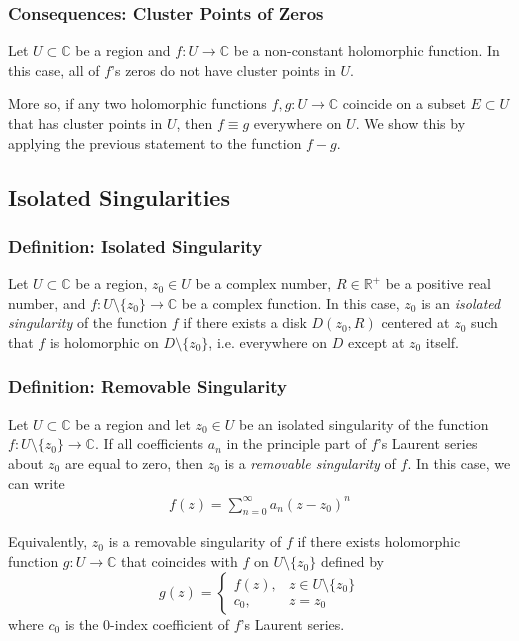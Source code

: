 \documentclass[11pt, a4paper]{article}
\newcommand{\R}{\mathbb{R}} %
\newcommand{\C}{\mathbb{C}} %
\begin{document}
\subsubsection{Consequences: Cluster Points of Zeros}
Let $ U \subset \C $ be a region and $ f: U \to \C $ be a non-constant holomorphic function. In this case, all of $ f $'s zeros do not have cluster points in $ U $.

More so, if any two holomorphic functions $ f, g: U \to \C $ coincide on a subset $ E \subset U $ that has cluster points in $ U $, then $ f \equiv g $ everywhere on $ U $. We show this by applying the previous statement to the function $ f - g $.

\subsection{Isolated Singularities}

\subsubsection{Definition: Isolated Singularity}
Let $ U \subset \C $ be a region, $ z_0 \in U $ be a complex number, $ R \in \R^{+} $ be a positive real number, and $ f: U \setminus \{z_0\} \to \C $ be a complex function. In this case, $ z_0 $ is an \textit{isolated singularity} of the function $ f $ if there exists a disk $ D(z_0, R) $ centered at $ z_0 $ such that $ f $ is holomorphic on $ D \setminus \{z_0\} $, i.e. everywhere on $ D $ except at $ z_0 $ itself.

\subsubsection{Definition: Removable Singularity}
Let $ U \subset \C $ be a region and let $ z_0 \in U $ be an isolated singularity of the function $ f: U \setminus \{z_0\} \to \C $. If all coefficients $ a_n $ in the principle part of $ f $'s Laurent series about $ z_0 $ are equal to zero, then $ z_0 $ is a \textit{removable singularity} of $ f $. In this case, we can write
\begin{align*}
	f(z) = \sum_{n=0}^{\infty}a_n(z - z_0)^n
\end{align*}

Equivalently, $ z_0 $ is a removable singularity of $ f $ if there exists holomorphic function $ g : U \to \C  $ that coincides with $ f $ on $ U \setminus \{z_0\} $ defined by
\[
	g(z) = \begin{cases}
		f(z), &  z \in U \setminus \{z_0\}\\
		c_0, & z = z_0
	\end{cases}
\]
where $ c_0 $ is the $ 0 $-index coefficient of $ f $'s Laurent series.
\end{document}
